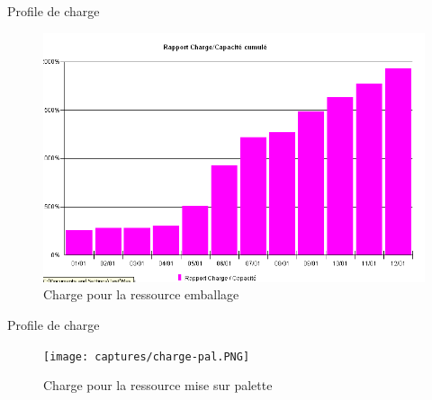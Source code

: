 \begin{frame}{Profile de charge}
\begin{figure}[H]
\centering
\includegraphics[scale=0.4]{captures/charge_emb.PNG}
\caption{Charge pour la ressource emballage}
\end{figure}
\end{frame}

\begin{frame}{Profile de charge}
\begin{figure}[H]
\centering
\texttt{[image: captures/charge-pal.PNG]}
\caption{Charge pour la ressource mise sur palette}
\end{figure}
\end{frame}